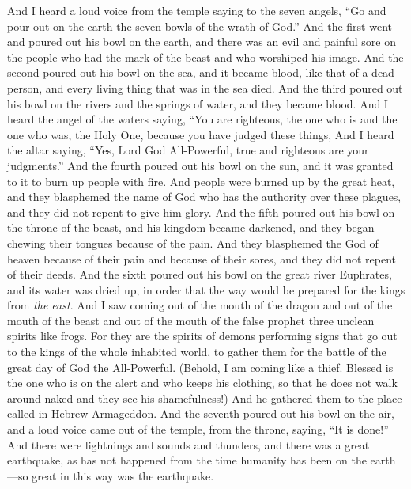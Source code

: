 \begin{biblechapter} %
 And I heard a loud voice from the temple saying to the seven angels, “Go and pour out on the earth the seven bowls of the wrath of God.”
\verse And the first went and poured out his bowl on the earth, and there was an evil and painful sore on the people who had the mark of the beast and who worshiped his image.
\verse And the second poured out his bowl on the sea, and it became blood, like that of a dead person, and every living thing that was in the sea died.
\verse And the third poured out his bowl on the rivers and the springs of water, and they became blood.
\verse And I heard the angel of the waters saying,
\verse “You are righteous, the one who is and the one who was, the Holy One, 
because you have judged these things,
\verse And I heard the altar saying, “Yes, Lord God All-Powerful, 
true and righteous are your judgments.”
\verse And the fourth poured out his bowl on the sun, and it was granted to it to burn up people with fire.
\verse And people were burned up by the great heat, and they blasphemed the name of God who has the authority over these plagues, and they did not repent to give him glory.
\verse And the fifth poured out his bowl on the throne of the beast, and his kingdom became darkened, and they began chewing their tongues because of the pain.
\verse And they blasphemed the God of heaven because of their pain and because of their sores, and they did not repent of their deeds.
\verse And the sixth poured out his bowl on the great river Euphrates, and its water was dried up, in order that the way would be prepared for the kings from \textit{the east}.
\verse And I saw coming out of the mouth of the dragon and out of the mouth of the beast and out of the mouth of the false prophet three unclean spirits like frogs.
\verse For they are the spirits of demons performing signs that go out to the kings of the whole inhabited world, to gather them for the battle of the great day of God the All-Powerful.
\verse (Behold, I am coming like a thief. Blessed is the one who is on the alert and who keeps his clothing, so that he does not walk around naked and they see his shamefulness!)
\verse And he gathered them to the place called in Hebrew Armageddon.
\verse And the seventh poured out his bowl on the air, and a loud voice came out of the temple, from the throne, saying, “It is done!”
\verse And there were lightnings and sounds and thunders, and there was a great earthquake, as has not happened from the time humanity has been on the earth—so great in this way was the earthquake.

\end{biblechapter}

